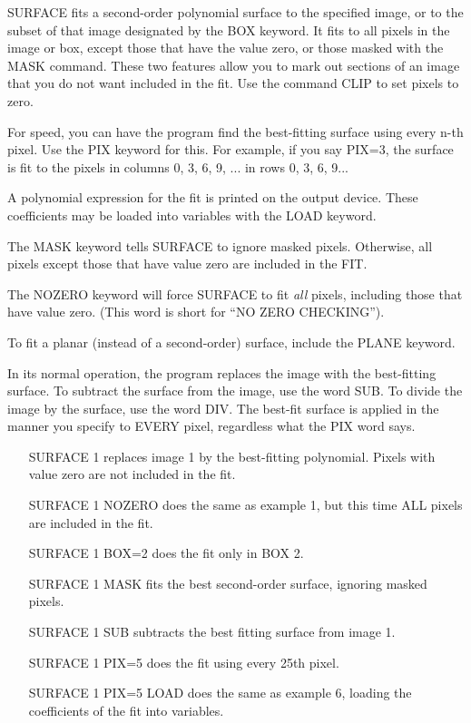 SURFACE fits a second-order polynomial surface to the specified image, or
to the subset of that image designated by the BOX keyword.  It fits to all
pixels in the image or box, except those that have the value zero, or those
masked with the MASK command. These two features allow you to mark out
sections of an image that you do not want included in the fit.  Use the
command CLIP to set pixels to zero.

For speed, you can have the program find the best-fitting surface using
every n-th pixel.  Use the PIX keyword for this. For example, if you say
PIX=3, the surface is fit to the pixels in columns 0, 3, 6, 9, ... in rows
0, 3, 6, 9...

A polynomial expression for the fit is printed on the output device.  These
coefficients may be loaded into variables with the LOAD keyword.

The MASK keyword tells SURFACE to ignore masked pixels.  Otherwise, all
pixels except those that have value zero are included in the FIT.  

The NOZERO keyword will force SURFACE to fit \textit{all} pixels, including
those that have value zero.  (This word is short for ``NO ZERO
CHECKING''). 

To fit a planar (instead of a second-order) surface, include the PLANE
keyword.

In its normal operation, the program replaces the image with the
best-fitting surface.  To subtract the surface from the image, use the word
SUB.  To divide the image by the surface, use the word DIV.  The best-fit
surface is applied in the manner you specify to EVERY pixel, regardless
what the PIX word says.


\begin{itemize}
  \item[SURFACE 1\hfill]{replaces image 1 by the best-fitting
       polynomial.  Pixels with value zero are not included in the fit.}
  \item[SURFACE 1 NOZERO\hfill]{does the same as example 1, but this
       time ALL pixels are included in the fit.}
  \item[SURFACE 1 BOX=2\hfill]{does the fit only in BOX 2.}
  \item[SURFACE 1 MASK\hfill]{fits the best second-order surface, ignoring
       masked pixels.}
  \item[SURFACE 1 SUB\hfill]{subtracts the best fitting surface from image 1.}
  \item[SURFACE 1 PIX=5\hfill]{does the fit using every 25th pixel.}
  \item[SURFACE 1 PIX=5 LOAD\hfill]{does the same as example 6, loading the
       coefficients of the fit into variables.}
\end{itemize}

